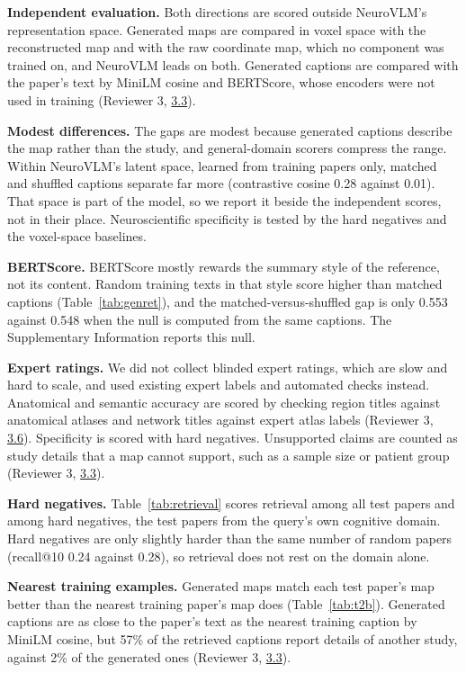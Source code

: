 \documentclass[11pt]{article}
\newcommand{\cmt}[1]{\hyperref[sec:#1]{#1}}
\begin{document}
\textbf{Independent evaluation.} Both directions are scored outside NeuroVLM's representation space. Generated maps are compared in voxel space with the reconstructed map and with the raw coordinate map, which no component was trained on, and NeuroVLM leads on both. Generated captions are compared with the paper's text by MiniLM cosine and BERTScore, whose encoders were not used in training (Reviewer 3, \cmt{3.3}).

\textbf{Modest differences.} The gaps are modest because generated captions describe the map rather than the study, and general-domain scorers compress the range. Within NeuroVLM's latent space, learned from training papers only, matched and shuffled captions separate far more (contrastive cosine 0.28 against 0.01). That space is part of the model, so we report it beside the independent scores, not in their place. Neuroscientific specificity is tested by the hard negatives and the voxel-space baselines.

\textbf{BERTScore.} BERTScore mostly rewards the summary style of the reference, not its content. Random training texts in that style score higher than matched captions (Table~\ref{tab:genret}), and the matched-versus-shuffled gap is only 0.553 against 0.548 when the null is computed from the same captions. The Supplementary Information reports this null.

\textbf{Expert ratings.} We did not collect blinded expert ratings, which are slow and hard to scale, and used existing expert labels and automated checks instead. Anatomical and semantic accuracy are scored by checking region titles against anatomical atlases and network titles against expert atlas labels (Reviewer 3, \cmt{3.6}). Specificity is scored with hard negatives. Unsupported claims are counted as study details that a map cannot support, such as a sample size or patient group (Reviewer 3, \cmt{3.3}).

\textbf{Hard negatives.} Table~\ref{tab:retrieval} scores retrieval among all test papers and among hard negatives, the test papers from the query's own cognitive domain. Hard negatives are only slightly harder than the same number of random papers (recall@10 0.24 against 0.28), so retrieval does not rest on the domain alone.

\textbf{Nearest training examples.} Generated maps match each test paper's map better than the nearest training paper's map does (Table~\ref{tab:t2b}). Generated captions are as close to the paper's text as the nearest training caption by MiniLM cosine, but 57\% of the retrieved captions report details of another study, against 2\% of the generated ones (Reviewer 3, \cmt{3.3}).
\end{document}
